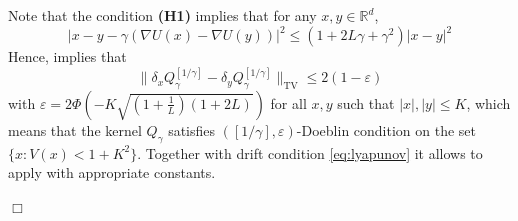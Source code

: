 \documentclass[bj]{imsart}
\def\rset{\mathbb{R}}
\def\rset{\mathbb{R}}
\newcommand{\proofendsign}{$\Box$}
\newenvironment{proof}{{\noindent \bf Proof }}
 {{\hspace*{\fill}\proofendsign\par\bigskip}}
\begin{document}
\begin{proof} Note that the condition {\bf (H1)} implies that for any $x,y \in \rset^d$,
\[
|x-y-\gamma(\nabla U(x) - \nabla U(y))|^2 \leq (1 + 2L\gamma + \gamma^2)|x-y|^2
\] 
Hence,   \cite[Corollary 5]{DurmusBortoli} implies that
\[
\|\delta_xQ^{[1/\gamma]}_{\gamma} - \delta_yQ^{[1/\gamma]}_{\gamma}\|_{\text{TV}} \leq 2(1-\varepsilon)
\]
with $\varepsilon = 2\Phi\left(-K\sqrt{\left(1+\frac{1}{L}\right)\left(1 + 2L\right)}\right)$ for all $x,y$ such that $|x|,|y| \leq K$, which means that the kernel $Q_{\gamma}$ satisfies $([1/\gamma],\varepsilon)$-Doeblin condition on the set $\{x: V(x) < 1+K^2\}$. Together with drift condition \eqref{eq:lyapunov} it allows to apply \cite[Theorem~19.4.1]{moulines2018} with appropriate constants.
\end{proof}
\end{document}
